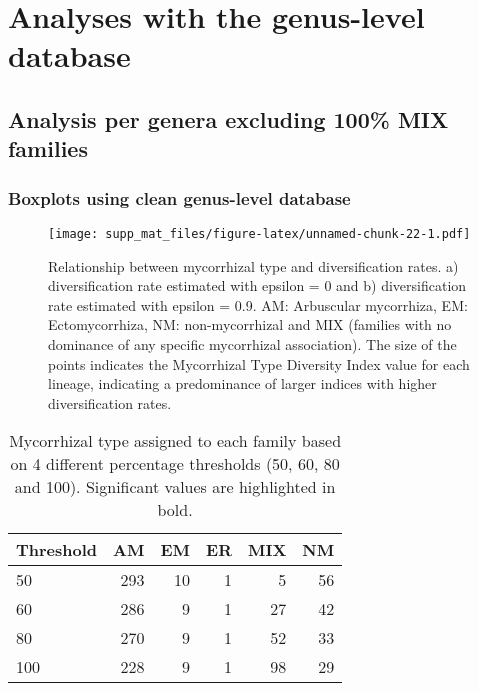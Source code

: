\documentclass[]{article}
\begin{document}
\hypertarget{analyses-with-the-genus-level-database}{%
\section{Analyses with the genus-level
database}\label{analyses-with-the-genus-level-database}}

\hypertarget{analysis-per-genera-excluding-100-mix-families}{%
\subsection{Analysis per genera excluding 100\% MIX
families}\label{analysis-per-genera-excluding-100-mix-families}}

\hypertarget{boxplots-using-clean-genus-level-database}{%
\subsubsection{Boxplots using clean genus-level
database}\label{boxplots-using-clean-genus-level-database}}

\begin{figure}
\centering
\texttt{[image: supp\_mat\_files/figure-latex/unnamed-chunk-22-1.pdf]}
\caption{Relationship between mycorrhizal type and diversification
rates. a) diversification rate estimated with epsilon = 0 and b)
diversification rate estimated with epsilon = 0.9. AM: Arbuscular
mycorrhiza, EM: Ectomycorrhiza, NM: non-mycorrhizal and MIX (families
with no dominance of any specific mycorrhizal association). The size of
the points indicates the Mycorrhizal Type Diversity Index value for each
lineage, indicating a predominance of larger indices with higher
diversification rates.}
\end{figure}

\begin{table}[H]

\caption{\label{tab:unnamed-chunk-23}Mycorrhizal type assigned to each family based on 4 different percentage thresholds (50, 60, 80 and 100). Significant values are highlighted in bold.}
\centering
\begin{tabular}{l|r|r|r|r|r}
\hline
Threshold & AM & EM & ER & MIX & NM\\
\hline
50 & 293 & 10 & 1 & 5 & 56\\
\hline
60 & 286 & 9 & 1 & 27 & 42\\
\hline
80 & 270 & 9 & 1 & 52 & 33\\
\hline
100 & 228 & 9 & 1 & 98 & 29\\
\hline
\end{tabular}
\end{table}
\end{document}
